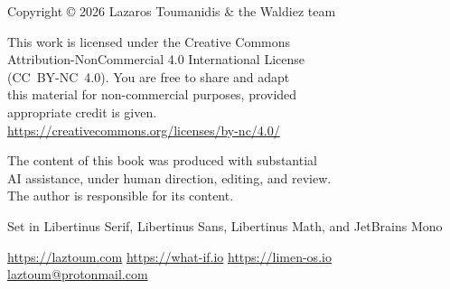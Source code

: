 \begin{flushleft}
		\small
		Copyright © 2026 Lazaros Toumanidis \& the Waldiez team

		This work is licensed under the Creative Commons\\
		Attribution-NonCommercial 4.0 International License\\
		(CC~BY-NC~4.0). You are free to share and adapt\\
		this material for non-commercial purposes, provided\\
		appropriate credit is given.\\
		\url{https://creativecommons.org/licenses/by-nc/4.0/}

		\vspace{\baselineskip}

		The content of this book was produced with substantial\\
		AI assistance, under human direction, editing, and review.\\
		The author is responsible for its content.

		\vspace{\baselineskip}

		Set in Libertinus Serif, Libertinus Sans, Libertinus Math, and JetBrains Mono

		\vspace{\baselineskip}

		\url{https://laztoum.com} \quad \url{https://what-if.io} \quad \url{https://limen-os.io}\\
		\href{mailto:laztoum@protonmail.com}{laztoum@protonmail.com}
	\end{flushleft}
